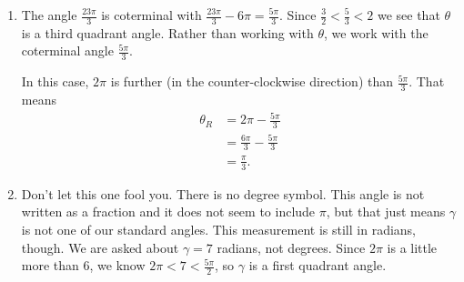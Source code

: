 \documentclass[nooutcomes]{ximera}
\begin{document}
\begin{exercise}
\begin{explanation}
\begin{enumerate}
			\item The angle $\frac{23\pi}{3}$ is coterminal with $\frac{23\pi}{3}-6\pi = \frac{5\pi}{3}$. Since $\frac{3}{2} < \frac{5}{3} < 2$ we see
				that $\theta$ is a third quadrant angle. Rather than working with $\theta$, we work with the coterminal angle $\frac{5\pi}{3}$.

				\begin{image}
				\end{image}
				In this case, $2\pi$ is further (in the counter-clockwise direction) than $\frac{5\pi}{3}$. That means
				\begin{align*}
					\theta_R &=2\pi - \frac{5\pi}{3} \\
						&= \frac{6\pi}{3}- \frac{5\pi}{3}\\
						&= \frac{\pi}{3}.
				\end{align*}

			\item Don't let this one fool you. There is no degree symbol. This angle is not written as a fraction and it does not seem to include $\pi$, but that just
			means $\gamma$ is not one of our standard angles. This measurement is still in radians, though. 
			We are asked about $\gamma = 7$ radians, not degrees. Since $2\pi$ is a little more than $6$, we know 
			$2\pi < 7 < \frac{5\pi}{2}$, so $\gamma$ is a first quadrant angle.


\end{enumerate}
\end{explanation}
\end{exercise}
\end{document}
